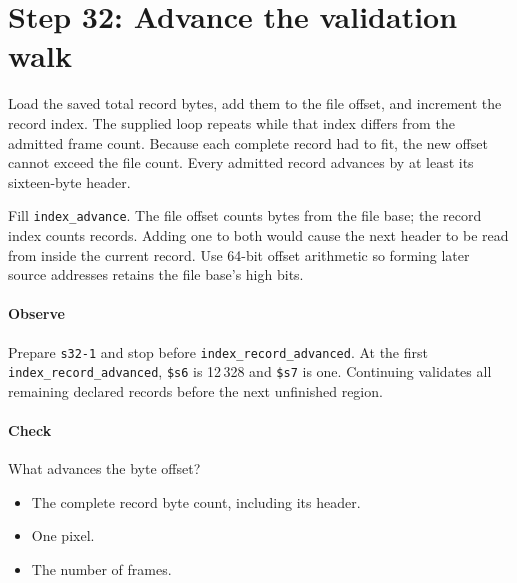 \section{Step 32: Advance the validation walk}
Load the saved total record bytes, add them to the file offset, and
increment the record index. The supplied loop repeats while that index differs
from the admitted frame count. Because each complete record had to fit, the
new offset cannot exceed the file count. Every admitted record advances by at
least its sixteen-byte header.

Fill \texttt{index\_advance}. The file offset counts bytes from the file base;
the record index counts records. Adding one to both would cause the next header
to be read from inside the current record. Use 64-bit offset arithmetic so
forming later source addresses retains the file base's high bits.

\paragraph{Observe} Prepare \texttt{s32-1} and stop before
\texttt{index\_record\_advanced}. At the first \texttt{index\_record\_advanced},
\texttt{\$s6} is 12\,328 and \texttt{\$s7} is one. Continuing validates
all remaining declared records before the next unfinished region.

\paragraph{Check} What advances the byte offset?
\begin{itemize}
  \item[A.] The complete record byte count, including its header.
  \item[B.] One pixel.
  \item[C.] The number of frames.
\end{itemize}
